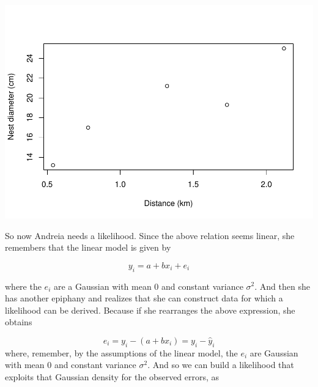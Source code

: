 \documentclass[
]{book}
\newenvironment{Shaded}{\begin{snugshade}}{\end{snugshade}}
\newcommand{\AttributeTok}[1]{\textcolor[rgb]{0.13,0.29,0.53}{#1}}
\newcommand{\CommentTok}[1]{\textcolor[rgb]{0.56,0.35,0.01}{\textit{#1}}}
\newcommand{\ControlFlowTok}[1]{\textcolor[rgb]{0.13,0.29,0.53}{\textbf{#1}}}
\newcommand{\DecValTok}[1]{\textcolor[rgb]{0.00,0.00,0.81}{#1}}
\newcommand{\FunctionTok}[1]{\textcolor[rgb]{0.13,0.29,0.53}{\textbf{#1}}}
\newcommand{\NormalTok}[1]{#1}
\newcommand{\OtherTok}[1]{\textcolor[rgb]{0.56,0.35,0.01}{#1}}
\newcommand{\SpecialCharTok}[1]{\textcolor[rgb]{0.81,0.36,0.00}{\textbf{#1}}}
\begin{document}
\includegraphics{ECOMODbook_files/figure-latex/ch13.26-1.pdf}

So now Andreia needs a likelihood. Since the above relation seems linear, she remembers that the linear model is given by

\[y_i=a+b x_i+e_i\]

where the \(e_i\) are a Gaussian with mean 0 and constant variance \(\sigma^2\). And then she has another epiphany and realizes that she can construct data for which a likelihood can be derived. Because if she rearranges the above expression, she obtains

\[e_i=y_i-(a+b x_i)=y_i-\hat y_i\]
where, remember, by the assumptions of the linear model, the \(e_i\) are Gaussian with mean 0 and constant variance \(\sigma^2\). And so we can build a likelihood that exploits that Gaussian density for the observed errors, as

\begin{Shaded}
\end{Shaded}
\end{document}
